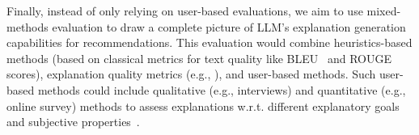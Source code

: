 Finally, instead of only relying on user-based evaluations, we aim to use mixed-methods evaluation to draw a complete picture of LLM's explanation generation capabilities for recommendations. This evaluation would combine heuristics-based methods (based on classical metrics for text quality like BLEU~\cite{papineni2002bleu} and ROUGE~\cite{lin2004rouge} scores), explanation quality metrics (e.g., \cite{Li2023PersonalizedPromptLearningExplainableRecommendation}), and user-based methods. Such user-based methods could include qualitative (e.g., interviews) and quantitative (e.g., online survey) methods to assess explanations w.r.t. different explanatory goals and subjective properties~\cite{Tintarev2015}.  

